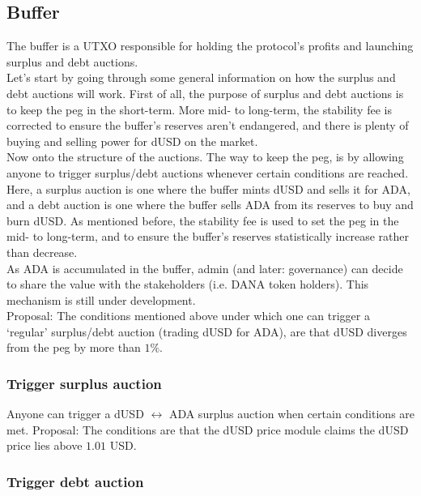 \documentclass{article} %
\begin{document}
\subsection{Buffer}

The buffer is a UTXO responsible for holding the protocol's profits and launching 
surplus and debt auctions. \\

Let's start by going through some general information on how the surplus and
debt auctions will work.
First of all, the purpose of surplus and debt auctions is to keep the peg in the
short-term.
More mid- to long-term, the stability fee is corrected to ensure the buffer's
reserves aren't endangered, and there is plenty of buying and selling power for
dUSD on the market. \\

Now onto the structure of the auctions.
The way to keep the peg, is by allowing anyone to trigger surplus/debt auctions
whenever certain conditions are reached.
Here, a surplus auction is one where the buffer mints dUSD and sells it for ADA,
and a debt auction is one where the buffer sells ADA from its reserves to buy
and burn dUSD.
As mentioned before, the stability fee is used to set the peg in the mid- to
long-term, and to ensure the buffer's reserves statistically increase rather
than decrease. \\

As ADA is accumulated in the buffer, admin (and later: governance) can decide to
share the value with the stakeholders (i.e. DANA token holders).
This mechanism is still under development. \\

Proposal: The conditions mentioned above under which one can trigger a `regular'
surplus/debt auction (trading dUSD for ADA), are that dUSD diverges from the peg
by more than $1\%$.

\subsubsection{Trigger surplus auction}

Anyone can trigger a dUSD $\leftrightarrow$ ADA surplus auction when certain
conditions are met.
Proposal: The conditions are that the dUSD price module claims the dUSD price
lies above $1.01$ USD.

\subsubsection{Trigger debt auction}
\end{document}

